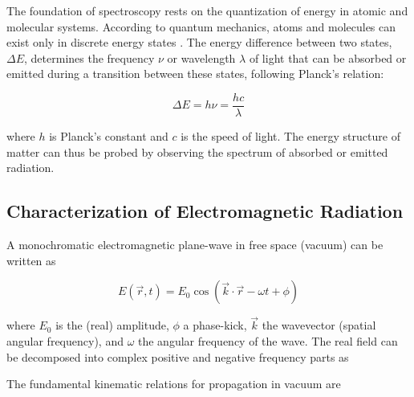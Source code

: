 \noindent The foundation of spectroscopy rests on the quantization of energy in atomic and molecular systems. According to quantum mechanics, atoms and molecules can exist only in discrete energy states \cite{albashetal2012quantumadiabaticmarkovian}. The energy difference between two states, $\Delta E$, determines the frequency $\nu$ or wavelength $\lambda$ of light that can be absorbed or emitted during a transition between these states, following Planck's relation:

\begin{equation}
	\Delta E = h\nu = \frac{hc}{\lambda}
	\label{eq:planck_relation}
\end{equation}

\noindent 
where $h$ is Planck's constant and $c$ is the speed of light. The energy structure of matter can thus be probed by observing the spectrum of absorbed or emitted radiation.


\subsection{Characterization of Electromagnetic Radiation}
\label{subsec:em_radiation_characterization}

\noindent 
A monochromatic electromagnetic plane-wave in free space (vacuum) can be written as

\begin{equation}
	E(\vec{r},t) = E_0 \cos(\vec{k} \cdot \vec{r} - \omega t + \phi)
	\label{eq:plane_wave}
\end{equation}

\noindent 
where $E_0$ is the (real) amplitude, $\phi$ a phase-kick, $\vec{k}$ the wavevector (spatial angular frequency), and $\omega$ the angular frequency of the wave. The real field can be decomposed into complex positive and negative frequency parts as

\noindent 
The fundamental kinematic relations for propagation in vacuum are


